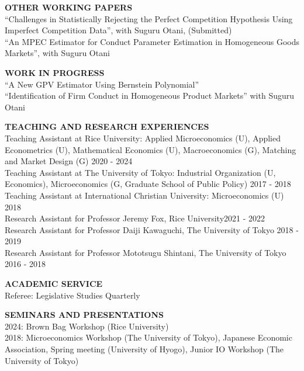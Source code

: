 \documentclass[10pt]{article}
\begin{document}
\vspace{10pt}

\textbf{OTHER WORKING PAPERS} \\
“Challenges in Statistically Rejecting the Perfect Competition Hypothesis Using Imperfect Competition Data”, with Suguru Otani, (Submitted) \\
“An MPEC Estimator for Conduct Parameter Estimation in Homogeneous Goods Markets”, with Suguru Otani

\vspace{10pt}

\textbf{WORK IN PROGRESS} \\
“A New GPV Estimator Using Bernstein Polynomial” \\
“Identification of Firm Conduct in Homogeneous Product Markets” with Suguru Otani

\vspace{10pt}

\textbf{TEACHING AND RESEARCH EXPERIENCES} \\
Teaching Assistant at Rice University: Applied Microeconomics (U), Applied Econometrics (U), Mathematical Economics (U), Macroeconomics (G), Matching and Market Design (G) \hfill 2020 - 2024\\
Teaching Assistant at The University of Tokyo: Industrial Organization (U, Economics), Microeconomics (G, Graduate School of Public Policy) \hfill  2017 - 2018\\
Teaching Assistant at International Christian University: Microeconomics (U) \hfill 2018\\
Research Assistant for Professor Jeremy Fox, Rice University\hfill 2021 - 2022\\
Research Assistant for Professor Daiji Kawaguchi, The University of Tokyo \hfill 2018 - 2019\\
Research Assistant for Professor Mototsugu Shintani, The University of Tokyo \hfill 2016 - 2018

\vspace{10pt}

\textbf{ACADEMIC SERVICE} \\
Referee: Legislative Studies Quarterly

\vspace{10pt}

\textbf{SEMINARS AND PRESENTATIONS} \\
2024: Brown Bag Workshop (Rice University) \\
2018: Microeconomics Workshop (The University of Tokyo), Japanese Economic Association, Spring meeting (University of Hyogo), Junior IO Workshop (The University of Tokyo)
\end{document}
